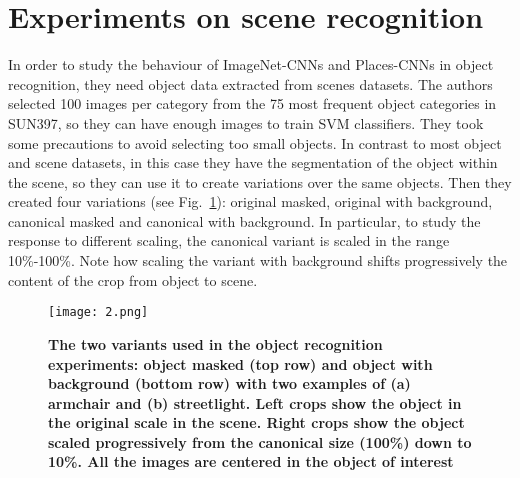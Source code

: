 \documentclass[10pt,twocolumn,letterpaper]{article}
\begin{document}
\section{Experiments on scene recognition}
In order to study the behaviour of ImageNet-CNNs and Places-CNNs in object recognition, they need object data extracted from scenes datasets. The authors selected 100 images per category from the 75 most frequent object categories in SUN397, so they can have enough images to train SVM classifiers. They took some precautions to avoid selecting too small objects. In contrast to most object and scene datasets, in this case they have the segmentation of the object within the scene, so they can use it to create variations over the same objects. Then they created four variations (see Fig.~\ref{Figure2}): original masked, original with background, canonical masked and canonical with background. In particular, to study the response to different scaling, the canonical variant is scaled in the range 10\%-100\%. Note how scaling the variant with background shifts progressively the content of the crop from object to scene.
\begin{figure}[!htb]
 \centering
 \texttt{[image: 2.png]}\\
 \caption{ \textbf{The two variants used in the object recognition experiments: object masked (top row) and object with background (bottom row) with two examples of (a) armchair and (b) streetlight. Left crops show the object in the original scale in the scene. Right crops show the object scaled progressively from the canonical size (100\%) down to 10\%. All the images are centered in the object of interest}}\label{Figure2}
 \end{figure}
\end{document}
